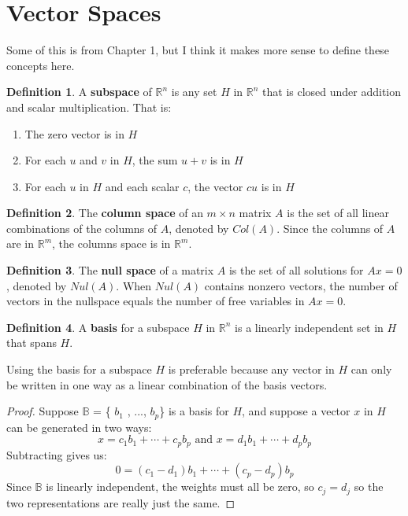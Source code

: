 \documentclass[letterpaper]{article}
\theoremstyle{definition}
\newtheorem{definition}{Definition}[section]
\begin{document}
\section{Vector Spaces}
Some of this is from Chapter 1, but I think it makes more sense to define these concepts here. 
\begin{definition} 
A \textbf{subspace} of $\mathbb{R}^n$ is any set $H$ in $\mathbb{R}^n$ that is closed under addition and scalar multiplication. That is:
\begin{enumerate}
	\item The zero vector is in $H$ 
	\item For each $u$ and $v$ in $H$, the sum $u + v$ is in $H$
	\item For each $u$ in $H$ and each scalar $c$, the vector $cu$ is in $H$
\end{enumerate}
\end{definition}

\begin{definition}
The \textbf{column space} of an $m \times n$ matrix $A$ is the set of all linear combinations of the columns of $A$, denoted by $Col(A)$. Since the columns of $A$ are in $\mathbb{R}^m$, the columns space is in $\mathbb{R}^m$. 
\end{definition}

\begin{definition}
The \textbf{null space} of a matrix $A$ is the set of all solutions for $Ax = 0$, denoted by $Nul(A)$. When $Nul(A)$ contains nonzero vectors, the number of vectors in the nullspace equals the number of free variables in $Ax = 0$. 
\end{definition}

\begin{definition}
A \textbf{basis} for a subspace $H$ in $\mathbb{R}^n$ is a linearly independent set in $H$ that spans $H$. 
\end{definition}

Using the basis for a subspace $H$ is preferable because any vector in $H$ can only be written in one way as a linear combination of the basis vectors. 
\begin{proof}
Suppose $\mathbb{B}$ = \{ $b_1$ , ..., $b_p$\} is a basis for $H$, and suppose a vector $x$ in $H$ can be generated in two ways: 
$$x = c_1 b_1 + \cdots + c_p b_p \text{ and } x = d_1 b_1 + \cdots + d_p b_p$$
Subtracting gives us:
$$0 = (c_1 - d_1)b_1 + \cdots + (c_p - d_p)b_p$$
Since $\mathbb{B}$ is linearly independent, the weights must all be zero, so $c_j = d_j$ so the two representations are really just the same. 
\end{proof}
\end{document}

